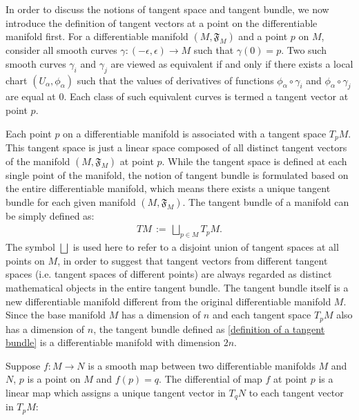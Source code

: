 \par In order to discuss the notions of tangent space and tangent bundle, we now introduce the definition of tangent vectors at a point on the differentiable manifold first. For a differentiable manifold $\left(M,\mathfrak{F}_{M}\right)$ and a point $p$ on $M$, consider all smooth curves $\gamma: \left(-\epsilon,\epsilon\right)\rightarrow M$ such that $\gamma\left(0\right)=p$. Two such smooth curves $\gamma_{i}$ and $\gamma_{j}$ are viewed as equivalent if and only if there exists a local chart $\left(U_{\alpha},\phi_{\alpha}\right)$ such that the values of derivatives of functions $\phi_{\alpha}\circ\gamma_{i}$ and $\phi_{\alpha}\circ\gamma_{j}$ are equal at $0$. Each class of such equivalent curves is termed a tangent vector at point $p$. 
\par Each point $p$ on a differentiable manifold is associated with a tangent space $T_{p}M$. This tangent space is just a linear space composed of all distinct tangent vectors of the manifold $\left(M,\mathfrak{F}_{M}\right)$ at point $p$. While the tangent space is defined at each single point of the manifold, the notion of tangent bundle is formulated based on the entire differentiable manifold, which means there exists a unique tangent bundle for each given manifold $\left(M,\mathfrak{F}_{M}\right)$. The tangent bundle of a manifold can be simply defined as:
\begin{equation}\label{definition of a tangent bundle}
    \begin{split}
        TM\,:=\,\bigsqcup_{p\in M} T_{p}M.
    \end{split}
\end{equation}
The symbol $\bigsqcup$ is used here to refer to a disjoint union of tangent spaces at all points on $M$, in order to suggest that tangent vectors from different tangent spaces (i.e. tangent spaces of different points) are always regarded as distinct mathematical objects in the entire tangent bundle. The tangent bundle itself is a new differentiable manifold different from the original differentiable manifold $M$. Since the base manifold $M$ has a dimension of $n$ and each tangent space $T_{p}M$ also has a dimension of $n$, the tangent bundle defined as \eqref{definition of a tangent bundle} is a differentiable manifold with dimension $2n$.
\par Suppose $f:M\rightarrow N$ is a smooth map between two differentiable manifolds $M$ and $N$, $p$ is a point on $M$ and $f\left(p\right)=q$. The differential of map $f$ at point $p$ is a linear map which assigns a unique tangent vector in $T_{q}N$ to each tangent vector in $T_{p}M$:

